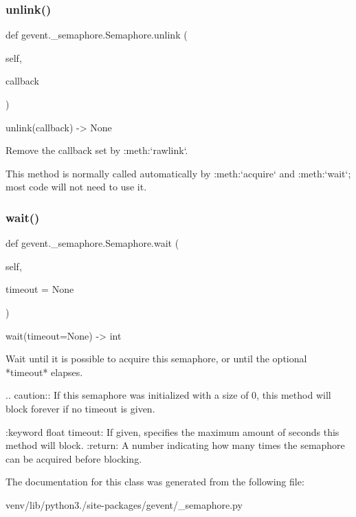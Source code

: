 \subsubsection{\texorpdfstring{unlink()}{unlink()}}
{\footnotesize\ttfamily def gevent.\+\_\+semaphore.\+Semaphore.\+unlink (\begin{DoxyParamCaption}\item[{}]{self,  }\item[{}]{callback }\end{DoxyParamCaption})}

\begin{DoxyVerb}unlink(callback) -> None

Remove the callback set by :meth:`rawlink`.

This method is normally called automatically by :meth:`acquire`  and :meth:`wait`; most
code will not need to use it.
\end{DoxyVerb}
 \mbox{\label{classgevent_1_1__semaphore_1_1_semaphore_a8827acbc1a049a86b7334a7361e201ba}} 
\subsubsection{\texorpdfstring{wait()}{wait()}}
{\footnotesize\ttfamily def gevent.\+\_\+semaphore.\+Semaphore.\+wait (\begin{DoxyParamCaption}\item[{}]{self,  }\item[{}]{timeout = {\ttfamily None} }\end{DoxyParamCaption})}

\begin{DoxyVerb}wait(timeout=None) -> int

Wait until it is possible to acquire this semaphore, or until the optional
*timeout* elapses.

.. caution:: If this semaphore was initialized with a size of 0,
   this method will block forever if no timeout is given.

:keyword float timeout: If given, specifies the maximum amount of seconds
   this method will block.
:return: A number indicating how many times the semaphore can be acquired
    before blocking.
\end{DoxyVerb}
 

The documentation for this class was generated from the following file\+:\begin{DoxyCompactItemize}
\item 
venv/lib/python3./site-\/packages/gevent/\+\_\+semaphore.\+py\end{DoxyCompactItemize}
